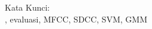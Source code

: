 


\vspace*{0.2cm}

\noindent Kata Kunci: \\ 
\noindent \quran, evaluasi, MFCC, SDCC, SVM, GMM \\ 

\newpage